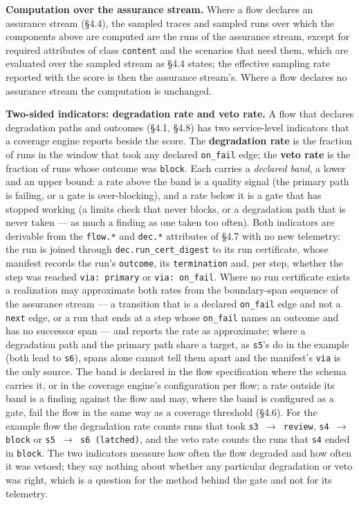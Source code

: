\documentclass[11pt]{article}
\newcommand{\code}[1]{\texttt{#1}}
\begin{document}
\textbf{Computation over the assurance stream.} Where a flow declares an assurance stream (\S4.4), the sampled traces and sampled runs over which the components above are computed are the runs of the assurance stream, except for required attributes of class \code{content} and the scenarios that need them, which are evaluated over the sampled stream as \S4.4 states; the effective sampling rate reported with the score is then the assurance stream's. Where a flow declares no assurance stream the computation is unchanged.

\textbf{Two-sided indicators: degradation rate and veto rate.} A flow that declares degradation paths and outcomes (\S4.1, \S4.8) has two service-level indicators that a coverage engine reports beside the score. The \textbf{degradation rate} is the fraction of runs in the window that took any declared \code{on\_fail} edge; the \textbf{veto rate} is the fraction of runs whose outcome was \code{block}. Each carries a \emph{declared band}, a lower and an upper bound: a rate above the band is a quality signal (the primary path is failing, or a gate is over-blocking), and a rate below it is a gate that has stopped working (a limits check that never blocks, or a degradation path that is never taken --- as much a finding as one taken too often). Both indicators are derivable from the \code{flow.*} and \code{dec.*} attributes of \S4.7 with no new telemetry: the run is joined through \code{dec.run\_cert\_digest} to its run certificate, whose manifest records the run's \code{outcome}, its \code{termination} and, per step, whether the step was reached \code{via: primary} or \code{via: on\_fail}. Where no run certificate exists a realization may approximate both rates from the boundary-span sequence of the assurance stream --- a transition that is a declared \code{on\_fail} edge and not a \code{next} edge, or a run that ends at a step whose \code{on\_fail} names an outcome and has no successor span --- and reports the rate as approximate; where a degradation path and the primary path share a target, as \code{s5}'s do in the example (both lead to \code{s6}), spans alone cannot tell them apart and the manifest's \code{via} is the only source. The band is declared in the flow specification where the schema carries it, or in the coverage engine's configuration per flow; a rate outside its band is a finding against the flow and may, where the band is configured as a gate, fail the flow in the same way as a coverage threshold (\S4.6). For the example flow the degradation rate counts runs that took \code{s3 \(\rightarrow\) review}, \code{s4 \(\rightarrow\) block} or \code{s5 \(\rightarrow\) s6 (latched)}, and the veto rate counts the runs that \code{s4} ended in \code{block}. The two indicators measure how often the flow degraded and how often it was vetoed; they say nothing about whether any particular degradation or veto was right, which is a question for the method behind the gate and not for its telemetry.
\end{document}

